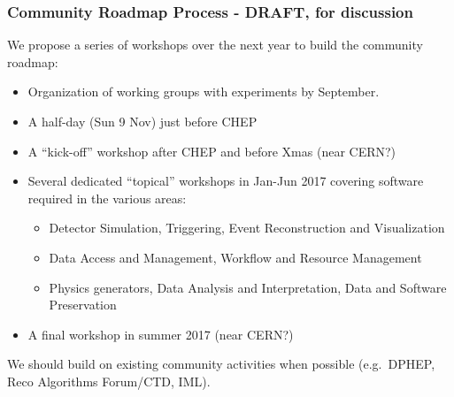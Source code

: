\begin{frame}
\frametitle{Community Roadmap Process - DRAFT, for discussion}

We propose a series of workshops over the next year to build the community roadmap:

\begin{itemize}
\item Organization of working groups with experiments by September.
\item A half-day (Sun 9 Nov) just before CHEP 
\item A ``kick-off'' workshop after CHEP and before Xmas (near CERN?)
\item Several dedicated ``topical'' workshops in Jan-Jun 2017 covering software required in the various areas:
\begin{itemize}
\item Detector Simulation, Triggering, Event Reconstruction and Visualization
\item Data Access and Management, Workflow and Resource Management
\item Physics generators, Data Analysis and Interpretation, Data and Software Preservation
\end{itemize}
\item A final workshop in summer 2017 (near CERN?)
\end{itemize}

We should build on existing community activities when possible (e.g.\ DPHEP, Reco Algorithms Forum/CTD, IML). 

\end{frame}


